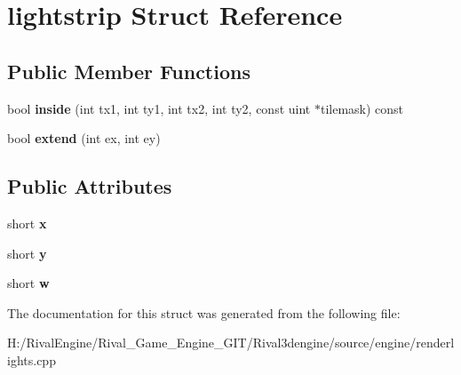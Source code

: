 \hypertarget{structlightstrip}{}\section{lightstrip Struct Reference}
\label{structlightstrip}
\subsection*{Public Member Functions}
\begin{DoxyCompactItemize}
\item 
\mbox{\label{structlightstrip_add03837f4bd6bfab5a14f0b5a52baa55}} 
bool {\bfseries inside} (int tx1, int ty1, int tx2, int ty2, const uint $\ast$tilemask) const
\item 
\mbox{\label{structlightstrip_a4f1720e75c241aad7d7353c26af1f76e}} 
bool {\bfseries extend} (int ex, int ey)
\end{DoxyCompactItemize}
\subsection*{Public Attributes}
\begin{DoxyCompactItemize}
\item 
\mbox{\label{structlightstrip_a41066b9a5c5860139933dc2ae82bc284}} 
short {\bfseries x}
\item 
\mbox{\label{structlightstrip_a8c5b8bad7116ff72bc53085de870d3c7}} 
short {\bfseries y}
\item 
\mbox{\label{structlightstrip_ad3df7de0ba49af093602c056c093377a}} 
short {\bfseries w}
\end{DoxyCompactItemize}


The documentation for this struct was generated from the following file\+:\begin{DoxyCompactItemize}
\item 
H\+:/\+Rival\+Engine/\+Rival\+\_\+\+Game\+\_\+\+Engine\+\_\+\+G\+I\+T/\+Rival3dengine/source/engine/renderlights.\+cpp\end{DoxyCompactItemize}
